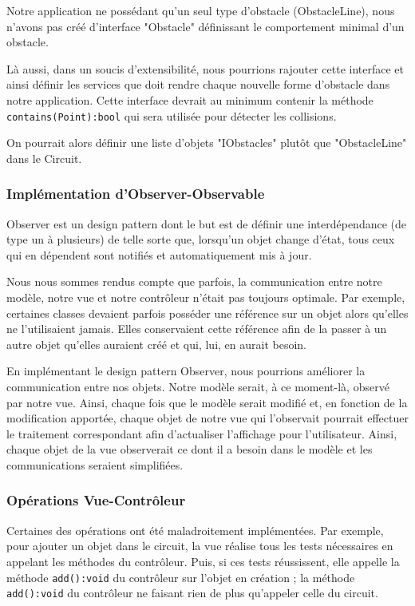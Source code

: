 \documentclass{report}
\begin{document}
Notre application ne possédant qu'un seul type d'obstacle (ObstacleLine), nous n'avons pas créé d'interface "Obstacle" définissant le comportement minimal d'un obstacle. 

Là aussi, dans un soucis d'extensibilité, nous pourrions rajouter cette interface et ainsi définir les services que doit rendre chaque nouvelle forme d'obstacle dans notre application. Cette interface devrait au minimum contenir la méthode \texttt{contains(Point):bool} qui sera utilisée pour détecter les collisions.

On pourrait alors définir une liste d'objets "IObstacles" plutôt que "ObstacleLine" dans le Circuit.

\subsubsection{Implémentation d'Observer-Observable}

Observer est un design pattern dont le but est de définir une interdépendance (de type un à plusieurs) de telle sorte que, lorsqu'un objet change d'état, tous ceux qui en dépendent sont notifiés et automatiquement mis à jour.

Nous nous sommes rendus compte que parfois, la communication entre notre modèle, notre vue et notre contrôleur n'était pas toujours optimale. Par exemple, certaines classes devaient parfois posséder une référence sur un objet alors qu'elles ne l'utilisaient jamais. Elles conservaient cette référence afin de la passer à un autre objet qu'elles auraient créé et qui, lui, en aurait besoin.

En implémentant le design pattern Observer, nous pourrions améliorer la communication entre nos objets. Notre modèle serait, à ce moment-là, observé par notre vue. Ainsi, chaque fois que le modèle serait modifié et, en fonction de la modification apportée, chaque objet de notre vue qui l'observait pourrait effectuer le traitement correspondant afin d'actualiser l'affichage pour l'utilisateur. Ainsi, chaque objet de la vue observerait ce dont il a besoin dans le modèle et les communications seraient simplifiées.

\subsubsection{Opérations Vue-Contrôleur}

Certaines des opérations ont été maladroitement implémentées. Par exemple, pour ajouter un objet dans le circuit, la vue réalise tous les tests nécessaires en appelant les méthodes du contrôleur. Puis, si ces tests réussissent, elle appelle la méthode \texttt{add():void} du contrôleur sur l'objet en création ; la méthode \texttt{add():void} du contrôleur ne faisant rien de plus qu'appeler celle du circuit.
\end{document}
